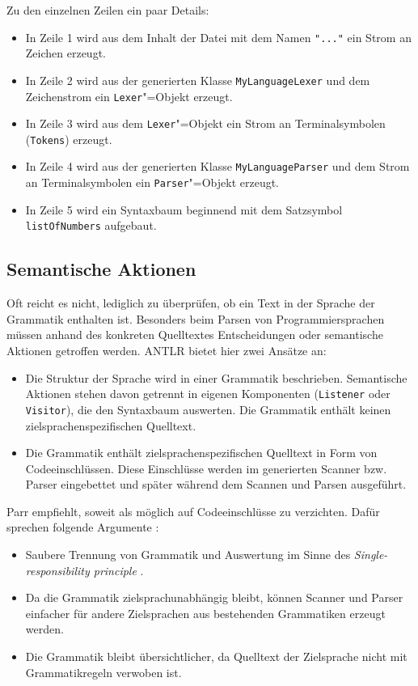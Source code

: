 Zu den einzelnen Zeilen ein paar Details:
\begin{itemize}
    \item In Zeile 1 wird aus dem Inhalt der Datei mit dem Namen \lstinline{"..."} ein Strom an Zeichen erzeugt.
    \item In Zeile 2 wird aus der generierten Klasse \lstinline{MyLanguageLexer} und dem Zeichenstrom ein \lstinline{Lexer}"=Objekt erzeugt.
    \item In Zeile 3 wird aus dem \lstinline{Lexer}"=Objekt ein Strom an Terminalsymbolen (\lstinline{Tokens}) erzeugt.
    \item In Zeile 4 wird aus der generierten Klasse \lstinline{MyLanguageParser} und dem Strom an Terminalsymbolen ein \lstinline{Parser}"=Objekt erzeugt.
    \item In Zeile 5 wird ein Syntaxbaum beginnend mit dem Satzsymbol \lstinline{listOfNumbers} aufgebaut.
\end{itemize}

\pagebreak
\subsection{Semantische Aktionen}

Oft reicht es nicht, lediglich zu überprüfen, ob ein Text in der Sprache der Grammatik enthalten ist. Besonders beim Parsen von Programmiersprachen müssen anhand des konkreten Quelltextes Entscheidungen oder semantische Aktionen getroffen werden. ANTLR bietet hier zwei Ansätze an:

\begin{itemize}
    \item Die Struktur der Sprache wird in einer Grammatik beschrieben. Semantische Aktionen stehen davon getrennt in eigenen Komponenten (\lstinline{Listener} oder \lstinline{Visitor}), die den Syntaxbaum auswerten. Die Grammatik enthält keinen zielsprachenspezifischen Quelltext.
    \item Die Grammatik enthält zielsprachenspezifischen Quelltext in Form von Codeeinschlüssen. Diese Einschlüsse werden im generierten Scanner bzw. Parser eingebettet und später während dem Scannen und Parsen ausgeführt. 
\end{itemize}

Parr empfiehlt, soweit als möglich auf Codeeinschlüsse zu verzichten. Dafür sprechen folgende Argumente \cite{ANTLR4Reference}:
\begin{itemize}
    \item Saubere Trennung von Grammatik und Auswertung im Sinne des \emph{Single-res\-pon\-si\-bi\-li\-ty principle} \cite{AgileSoftwareDevelopmentPPP}.
    \item Da die Grammatik zielsprachunabhängig bleibt, können Scanner und Parser einfacher für andere Zielsprachen aus bestehenden Grammatiken erzeugt werden.
    \item Die Grammatik bleibt übersichtlicher, da Quelltext der Zielsprache nicht mit Grammatikregeln verwoben ist.
\end{itemize}

